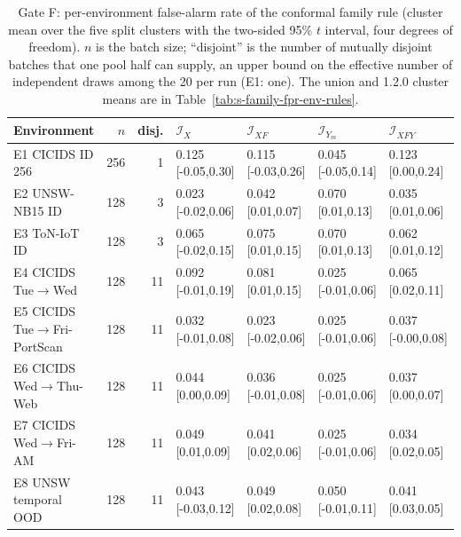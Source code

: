 \begin{table}[!t]
\caption{Gate F: per-environment false-alarm rate of the conformal family rule (cluster mean over the five split clusters with the two-sided 95\% $t$ interval, four degrees of freedom). $n$ is the batch size; ``disjoint'' is the number of mutually disjoint batches that one pool half can supply, an upper bound on the effective number of independent draws among the 20 per run (E1: one). The union and 1.2.0 cluster means are in Table~\ref{tab:s-family-fpr-env-rules}.}
\label{tab:s-family-fpr-env}
\centering
\scriptsize
\setlength{\tabcolsep}{2pt}
\begin{tabular}{@{}lrrllll@{}}
\toprule
Environment & $n$ & disj. & $\mathcal I_X$ & $\mathcal I_{XF}$ & $\mathcal I_{Y_m}$ & $\mathcal I_{XFY}$ \\
\midrule
E1 CICIDS ID 256 & 256 & 1 & 0.125 [-0.05,0.30] & 0.115 [-0.03,0.26] & 0.045 [-0.05,0.14] & 0.123 [0.00,0.24] \\
E2 UNSW-NB15 ID & 128 & 3 & 0.023 [-0.02,0.06] & 0.042 [0.01,0.07] & 0.070 [0.01,0.13] & 0.035 [0.01,0.06] \\
E3 ToN-IoT ID & 128 & 3 & 0.065 [-0.02,0.15] & 0.075 [0.01,0.15] & 0.070 [0.01,0.13] & 0.062 [0.01,0.12] \\
E4 CICIDS Tue$\to$Wed & 128 & 11 & 0.092 [-0.01,0.19] & 0.081 [0.01,0.15] & 0.025 [-0.01,0.06] & 0.065 [0.02,0.11] \\
E5 CICIDS Tue$\to$Fri-PortScan & 128 & 11 & 0.032 [-0.01,0.08] & 0.023 [-0.02,0.06] & 0.025 [-0.01,0.06] & 0.037 [-0.00,0.08] \\
E6 CICIDS Wed$\to$Thu-Web & 128 & 11 & 0.044 [0.00,0.09] & 0.036 [-0.01,0.08] & 0.025 [-0.01,0.06] & 0.037 [0.00,0.07] \\
E7 CICIDS Wed$\to$Fri-AM & 128 & 11 & 0.049 [0.01,0.09] & 0.041 [0.02,0.06] & 0.025 [-0.01,0.06] & 0.034 [0.02,0.05] \\
E8 UNSW temporal OOD & 128 & 11 & 0.043 [-0.03,0.12] & 0.049 [0.02,0.08] & 0.050 [-0.01,0.11] & 0.041 [0.03,0.05] \\
\bottomrule
\end{tabular}
\end{table}
